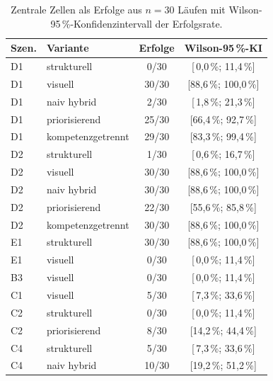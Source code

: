 \begin{table}[ht]
  \centering
  \caption{Zentrale Zellen als Erfolge aus $n=30$ Läufen mit
           Wilson-95\,\%-Konfidenzintervall der Erfolgsrate.}
  \label{tab:stats}
  \small
  \setlength{\tabcolsep}{5pt}
  \renewcommand{\arraystretch}{1.2}
  \begin{tabular}{@{}l l c c@{}}
    \toprule
    Szen. & Variante & Erfolge & Wilson-95\,\%-KI \\
    \midrule
    D1 & strukturell       &  0/30 & [\,0{,}0\,\%; 11{,}4\,\%] \\
    D1 & visuell           & 30/30 & [88{,}6\,\%; 100{,}0\,\%] \\
    D1 & naiv hybrid       &  2/30 & [\,1{,}8\,\%; 21{,}3\,\%] \\
    D1 & priorisierend     & 25/30 & [66{,}4\,\%; 92{,}7\,\%] \\
    D1 & kompetenzgetrennt & 29/30 & [83{,}3\,\%; 99{,}4\,\%] \\
    \addlinespace
    D2 & strukturell       &  1/30 & [\,0{,}6\,\%; 16{,}7\,\%] \\
    D2 & visuell           & 30/30 & [88{,}6\,\%; 100{,}0\,\%] \\
    D2 & naiv hybrid       & 30/30 & [88{,}6\,\%; 100{,}0\,\%] \\
    D2 & priorisierend     & 22/30 & [55{,}6\,\%; 85{,}8\,\%] \\
    D2 & kompetenzgetrennt & 30/30 & [88{,}6\,\%; 100{,}0\,\%] \\
    \addlinespace
    E1 & strukturell       & 30/30 & [88{,}6\,\%; 100{,}0\,\%] \\
    E1 & visuell           &  0/30 & [\,0{,}0\,\%; 11{,}4\,\%] \\
    B3 & visuell           &  0/30 & [\,0{,}0\,\%; 11{,}4\,\%] \\
    C1 & visuell           &  5/30 & [\,7{,}3\,\%; 33{,}6\,\%] \\
    \addlinespace
    C2 & strukturell       &  0/30 & [\,0{,}0\,\%; 11{,}4\,\%] \\
    C2 & priorisierend     &  8/30 & [14{,}2\,\%; 44{,}4\,\%] \\
    C4 & strukturell       &  5/30 & [\,7{,}3\,\%; 33{,}6\,\%] \\
    C4 & naiv hybrid       & 10/30 & [19{,}2\,\%; 51{,}2\,\%] \\
    \bottomrule
  \end{tabular}
\end{table}

